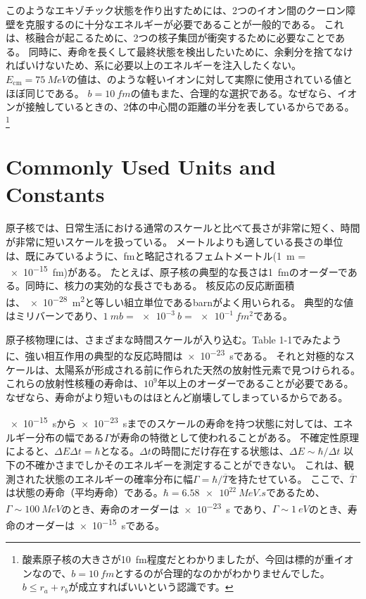 \documentclass[a4paper,11pt,titlepage,uplatex]{jsarticle}
\begin{document}
このようなエキゾチック状態を作り出すためには、2つのイオン間のクーロン障壁を克服するのに十分なエネルギーが必要であることが一般的である。
これは、核融合が起こるために、2つの核子集団が衝突するために必要なことである。
同時に、寿命を長くして最終状態を検出したいために、余剰分を捨てなければいけないため、系に必要以上のエネルギーを注入したくない。
$E_{\text{cm}} = \SI{75}{MeV}$の値は、のような軽いイオンに対して実際に使用されている値とほぼ同じである。
$b=\SI{10}{fm}$の値もまた、合理的な選択である。なぜなら、イオンが接触しているときの、2体の中心間の距離の半分を表しているからである。
\footnote{酸素原子核の大きさが\SI{10}{fm}程度だとわかりましたが、今回は標的が重イオンなので、$b=\SI{10}{fm}$とするのが合理的なのかがわかりませんでした。$b\leq r_a+r_b$が成立すればいいという認識です。}

\section{Commonly Used Units and Constants}
原子核では、日常生活における通常のスケールと比べて長さが非常に短く、時間が非常に短いスケールを扱っている。
メートルよりも適している長さの単位は、既にみているように、\si{fm}と略記されるフェムトメートル(\SI{1}{m} = \SI{e-15}{fm})がある。
たとえば、原子核の典型的な長さは\SI{1}{fm}のオーダーである。同時に、核力の実効的な長さでもある。
核反応の反応断面積は、\SI{e-28}{m^2}と等しい組立単位であるbarnがよく用いられる。
典型的な値はミリバーンであり、$\SI{1}{mb} = \SI{e-3}{b} = \SI{e-1}{fm^2}$である。

原子核物理には、さまざまな時間スケールが入り込む。Table 1-1でみたように、強い相互作用の典型的な反応時間は\SI{e-23}{s}である。
それと対極的なスケールは、太陽系が形成される前に作られた天然の放射性元素で見つけられる。
これらの放射性核種の寿命は、$10^9$年以上のオーダーであることが必要である。なぜなら、寿命がより短いものはほとんど崩壊してしまっているからである。

\SI{e-15}{s}から\SI{e-23}{s}までのスケールの寿命を持つ状態に対しては、エネルギー分布の幅である$\Gamma$が寿命の特徴として使われることがある。
不確定性原理によると、$\varDelta E\varDelta t = \hbar$となる。$\varDelta t$の時間にだけ存在する状態は、$\varDelta E \sim \hbar/\varDelta t$
以下の不確かさまでしかそのエネルギーを測定することができない。
これは、観測された状態のエネルギーの確率分布に幅$\Gamma = \hbar/\overline{T}$を持たせている。
ここで、$\overline{T}$は状態の寿命（平均寿命）である。$\hbar=\SI{6.58e22}{MeV.s}$であるため、$\Gamma\sim \SI{100}{MeV}$のとき、寿命のオーダーは\SI{e-23}{s}
であり、$\Gamma\sim\SI{1}{eV}$のとき、寿命のオーダーは\SI{e-15}{s}である。
\end{document}
